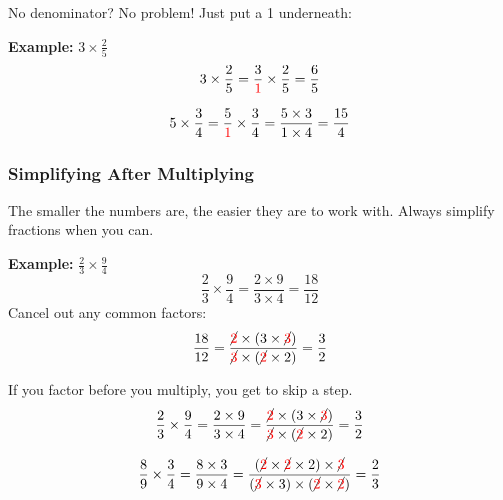 \documentclass[
  letterpaper,
  DIV=11,
  numbers=noendperiod]{scrreprt}
\begin{document}
No denominator? No problem! Just put a 1 underneath:

\textbf{Example:} \(3 \times \frac{2}{5}\) \[
3 \times \frac{2}{5} = \frac{3}{\color{red}1} \times \frac{2}{5} = \frac{6}{5}
\]

\[
5 \times \frac{3}{4} = \frac{5}{\color{red}1} \times \frac{3}{4} = \frac{5 \times 3}{1 \times 4} = \frac{15}{4}
\]

\subsubsection*{\texorpdfstring{\textbf{Simplifying After
Multiplying}}{Simplifying After Multiplying}}\label{simplifying-after-multiplying}

The smaller the numbers are, the easier they are to work with. Always
simplify fractions when you can.

\textbf{Example:} \(\frac{2}{3} \times \frac{9}{4}\) \[
\frac{2}{3} \times \frac{9}{4} = \frac{2 \times 9}{3 \times 4} = \frac{18}{12}
\] Cancel out any common factors: \[
\frac{18}{12}
= \frac{\cancel{\color{red}2} \times (3 \times \cancel{\color{red}3})}{\cancel{\color{red}3} \times (\cancel{\color{red}2} \times 2)}
= \frac{3}{2}
\]

\begin{tcolorbox}[enhanced jigsaw, left=2mm, opacityback=0, colback=white, rightrule=.15mm, toptitle=1mm, colframe=quarto-callout-tip-color-frame, leftrule=.75mm, toprule=.15mm, breakable, bottomtitle=1mm, bottomrule=.15mm, colbacktitle=quarto-callout-tip-color!10!white, arc=.35mm, opacitybacktitle=0.6, titlerule=0mm, coltitle=black, title=\textcolor{quarto-callout-tip-color}{\faLightbulb}\hspace{0.5em}{Tip}]

If you factor before you multiply, you get to skip a step. \[
\frac{2}{3} \times \frac{9}{4} = \frac{2 \times 9}{3 \times 4} = \frac{\cancel{\color{red}2} \times (3 \times \cancel{\color{red}3})}{\cancel{\color{red}3}  \times (\cancel{\color{red}2} \times 2)}
= \frac{3}{2}
\]

\end{tcolorbox}

\[
\frac{8}{9} \times \frac{3}{4} = \frac{8 \times 3}{9 \times 4} = \frac{(\cancel{\color{red}2} \times \cancel{\color{red}2} \times 2) \times \cancel{\color{red}3}}{(\cancel{\color{red}3} \times 3) \times (\cancel{\color{red}2} \times \cancel{\color{red}2})} = \frac{2}{3}
\]
\end{document}
